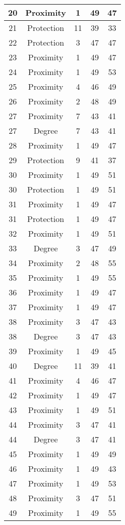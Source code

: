 \documentclass[results.tex]{subfiles}
\begin{document}
\begin{center}
\begin{tabular}{| c || c | c | c | c |}
    \hline
    20 & Proximity & 1 & 49 & 47 \\ 
    \hline
    21 & Protection & 11 & 39 & 33 \\ 
    \hline
    22 & Protection & 3 & 47 & 47 \\ 
    \hline
    23 & Proximity & 1 & 49 & 47 \\ 
    \hline
    24 & Proximity & 1 & 49 & 53 \\ 
    \hline
    25 & Proximity & 4 & 46 & 49 \\ 
    \hline
    26 & Proximity & 2 & 48 & 49 \\ 
    \hline
    27 & Proximity & 7 & 43 & 41 \\ 
    \hline
    27 & Degree & 7 & 43 & 41 \\ 
    \hline
    28 & Proximity & 1 & 49 & 47 \\ 
    \hline
    29 & Protection & 9 & 41 & 37 \\ 
    \hline
    30 & Proximity & 1 & 49 & 51 \\ 
    \hline
    30 & Protection & 1 & 49 & 51 \\ 
    \hline
    31 & Proximity & 1 & 49 & 47 \\ 
    \hline
    31 & Protection & 1 & 49 & 47 \\ 
    \hline
    32 & Proximity & 1 & 49 & 51 \\ 
    \hline
    33 & Degree & 3 & 47 & 49 \\ 
    \hline
    34 & Proximity & 2 & 48 & 55 \\ 
    \hline
    35 & Proximity & 1 & 49 & 55 \\ 
    \hline
    36 & Proximity & 1 & 49 & 47 \\ 
    \hline
    37 & Proximity & 1 & 49 & 47 \\ 
    \hline
    38 & Proximity & 3 & 47 & 43 \\ 
    \hline
    38 & Degree & 3 & 47 & 43 \\ 
    \hline
    39 & Proximity & 1 & 49 & 45 \\ 
    \hline
    40 & Degree & 11 & 39 & 41 \\ 
    \hline
    41 & Proximity & 4 & 46 & 47 \\ 
    \hline
    42 & Proximity & 1 & 49 & 47 \\ 
    \hline
    43 & Proximity & 1 & 49 & 51 \\ 
    \hline
    44 & Proximity & 3 & 47 & 41 \\ 
    \hline
    44 & Degree & 3 & 47 & 41 \\ 
    \hline
    45 & Proximity & 1 & 49 & 49 \\ 
    \hline
    46 & Proximity & 1 & 49 & 43 \\ 
    \hline
    47 & Proximity & 1 & 49 & 53 \\ 
    \hline
    48 & Proximity & 3 & 47 & 51 \\ 
    \hline
    49 & Proximity & 1 & 49 & 55 \\ 
    \hline   \end{tabular}
\end{center}
\end{document}
